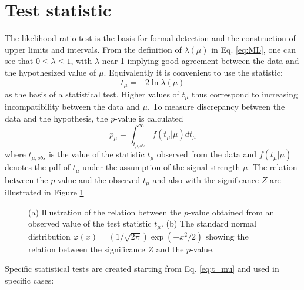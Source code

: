 \documentclass[a4paper, oneside, 11pt, openright]{book}
\begin{document}
 		\section{Test statistic}
 			The likelihood-ratio test \cite{Statistic} is the basis for formal detection and the construction of upper limits and intervals. %
 			From the definition of $\lambda(\mu)$ in Eq. \ref{eq:ML}, one can see that $0 \leq \lambda \leq 1$, with $\lambda$ near 1 implying good agreement between the data and the hypothesized value of $\mu$. Equivalently it is convenient to use the statistic:
 			\begin{equation}\label{eq:t_mu}
 				t_{\mu} = -2\ln\lambda(\mu)
 			\end{equation}
 			as the basis of a statistical test. Higher values of $t_{\mu}$ thus correspond to increasing incompatibility between the data and $\mu$. To measure discrepancy between the data and the hypothesis, the $p$-value is calculated
 			\begin{equation}\label{eq:p_mu}
 				p_{\mu} = \int_{t_{\mu,obs}}^{\infty} f(t_{\mu}|\mu) dt_{\mu}
 			\end{equation}
 			where $t_{\mu,obs}$ is the value of the statistic $t_{\mu}$ observed from the data and $f(t_{\mu}|\mu)$ denotes the pdf of $t_{\mu}$ under the assumption of the signal strength $\mu$. The relation between the $p$-value and the observed $t_{\mu}$ and also with the significance $Z$ are illustrated in Figure \ref{fig:p_mu_Z}
 			\begin{figure}
 				\centering
 				\caption{(a) Illustration of the relation between the $p$-value obtained from an observed value of the test statistic $t_{\mu}$. (b) The standard normal distribution $\varphi(x)=(1/\sqrt{2\pi})\exp(-x^2/2)$ showing the relation between the significance $Z$ and the $p$-value.}
 				\label{fig:p_mu_Z}
 			\end{figure}
 			Specific statistical tests are created starting from Eq. \ref{eq:t_mu} and used in specific cases:
\end{document}
